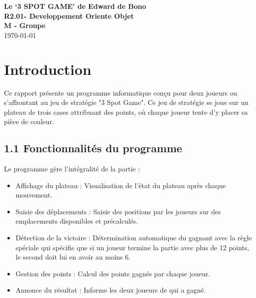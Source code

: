 \documentclass[a4paper,11pt]{article}
\begin{document}
\begin{titlepage}
    \centering
    \vspace*{\fill}
    {\Huge\textbf{Le `3 SPOT GAME' de Edward de Bono}} \\
    \vspace{20pt} %
    {\Large\textbf{R2.01- Developpement Oriente Objet}} \\
    \vspace{20pt} %
    {\textbf{M - Groupe } \\
    \vspace{20pt} %
    {\today} \\ %
    \vspace*{\fill}}
\end{titlepage}

\tableofcontents

\newpage
\section{Introduction}
Ce rapport présente un programme informatique conçu pour deux joueurs ou s'affrontant au jeu de stratégie "3 Spot Game". Ce jeu de stratégie se joue sur un plateau de trois cases attribuant des points, où chaque joueur tente d'y placer sa pièce de couleur.

\subsection{1.1 Fonctionnalités du programme}

Le programme gère l'intégralité de la partie :
\begin{itemize}
    \item Affichage du plateau : Visualisation de l'état du plateau après chaque mouvement.
    \item Saisie des déplacements : Saisie des positions par les joueurs sur des emplacements disponibles et précalculés.
    \item Détection de la victoire : Détermination automatique du gagnant avec la règle spéciale qui spécifie que si un joueur termine la partie avec plus de 12 points, le second doit lui en avoir au moins 6.
    \item Gestion des points : Calcul des points gagnés par chaque joueur.
    \item Annonce du résultat : Informe les deux joueurs de qui a gagné.
\end{itemize}
\end{document}
